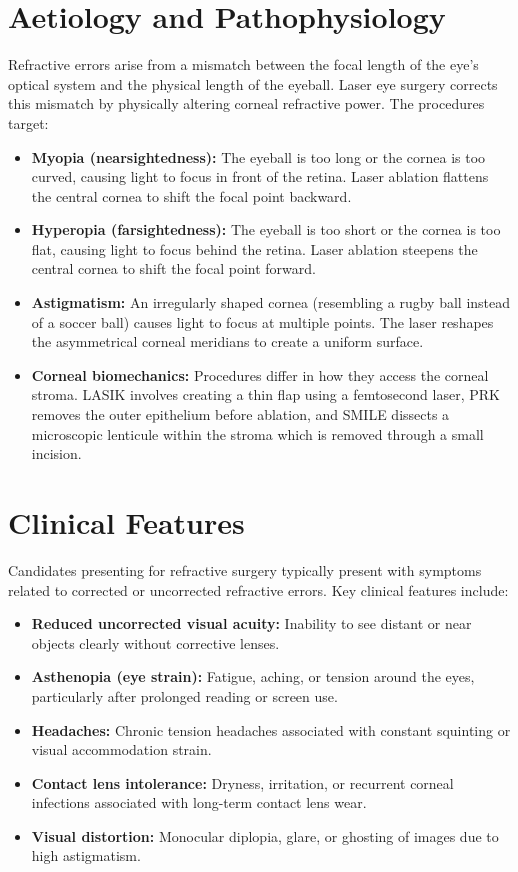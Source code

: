 \section*{Aetiology and Pathophysiology}
Refractive errors arise from a mismatch between the focal length of the eye's optical system and the physical length of the eyeball. Laser eye surgery corrects this mismatch by physically altering corneal refractive power. The procedures target:
\begin{itemize}
    \item \textbf{Myopia (nearsightedness):} The eyeball is too long or the cornea is too curved, causing light to focus in front of the retina. Laser ablation flattens the central cornea to shift the focal point backward.
    \item \textbf{Hyperopia (farsightedness):} The eyeball is too short or the cornea is too flat, causing light to focus behind the retina. Laser ablation steepens the central cornea to shift the focal point forward.
    \item \textbf{Astigmatism:} An irregularly shaped cornea (resembling a rugby ball instead of a soccer ball) causes light to focus at multiple points. The laser reshapes the asymmetrical corneal meridians to create a uniform surface.
    \item \textbf{Corneal biomechanics:} Procedures differ in how they access the corneal stroma. LASIK involves creating a thin flap using a femtosecond laser, PRK removes the outer epithelium before ablation, and SMILE dissects a microscopic lenticule within the stroma which is removed through a small incision.
\end{itemize}

\section*{Clinical Features}
Candidates presenting for refractive surgery typically present with symptoms related to corrected or uncorrected refractive errors. Key clinical features include:
\begin{itemize}
    \item \textbf{Reduced uncorrected visual acuity:} Inability to see distant or near objects clearly without corrective lenses.
    \item \textbf{Asthenopia (eye strain):} Fatigue, aching, or tension around the eyes, particularly after prolonged reading or screen use.
    \item \textbf{Headaches:} Chronic tension headaches associated with constant squinting or visual accommodation strain.
    \item \textbf{Contact lens intolerance:} Dryness, irritation, or recurrent corneal infections associated with long-term contact lens wear.
    \item \textbf{Visual distortion:} Monocular diplopia, glare, or ghosting of images due to high astigmatism.
\end{itemize}


